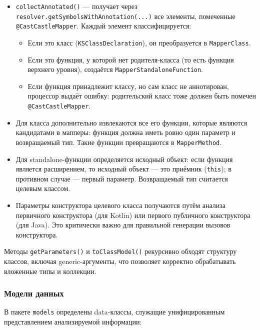 \begin{itemize}
    \item \texttt{collectAnnotated()} — получает через \texttt{resolver.getSymbolsWithAnnotation(...)} все элементы, помеченные \texttt{@CastCastleMapper}. Каждый элемент классифицируется:
        \begin{itemize}
            \item Если это класс (\texttt{KSClassDeclaration}), он преобразуется в \texttt{MapperClass}.
            \item Если это функция, у которой нет родителя-класса (то есть функция верхнего уровня), создаётся \texttt{MapperStandaloneFunction}.
            \item Если функция принадлежит классу, но сам класс не аннотирован, процессор выдаёт ошибку: родительский класс тоже должен быть помечен \texttt{@CastCastleMapper}.
        \end{itemize}
    \item Для класса дополнительно извлекаются все его функции, которые являются кандидатами в мапперы: функция должна иметь ровно один параметр и возвращаемый тип. Такие функции превращаются в \texttt{MapperMethod}.
    \item Для standalone-функции определяется исходный объект: если функция является расширением, то исходный объект — это приёмник (\texttt{this}); в противном случае — первый параметр. Возвращаемый тип считается целевым классом.
    \item Параметры конструктора целевого класса получаются путём анализа первичного конструктора (для Kotlin) или первого публичного конструктора (для Java). Это критически важно для правильной генерации вызовов конструктора.
\end{itemize}

Методы \texttt{getParameters()} и \texttt{toClassModel()} рекурсивно обходят структуру классов, включая generic-аргументы, что позволяет корректно обрабатывать вложенные типы и коллекции.

\subsubsection{Модели данных}

В пакете \texttt{models} определены data-классы, служащие унифицированным представлением анализируемой информации:

